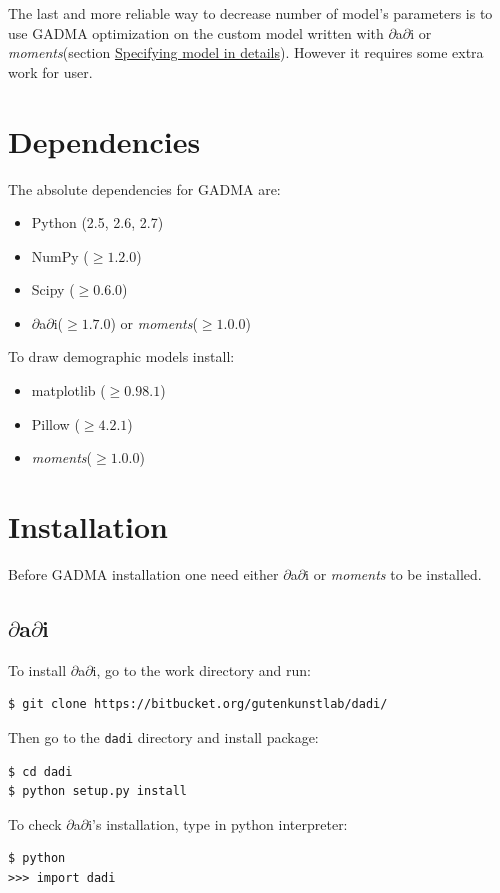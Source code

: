 \documentclass[12pt]{article}
\makeatletter
\newcommand{\dadi}{$\partial$a$\partial$i\xspace}
\newcommand{\moments}{\textit{moments}\xspace}
\newcommand{\py}[1]{\lstinline[language=Python, showstringspaces=False]@#1@}
\makeatother
\begin{document}
The last and more reliable way to decrease number of model's parameters is to use GADMA optimization on the custom model written with \dadi or \moments (section \hyperref[sec:spec-model-in-det]{Specifying model in details}). However it requires some extra work for user.

\newpage
\section{Dependencies}
The absolute dependencies for GADMA are:
\begin{itemize}
    \item Python (2.5, 2.6, 2.7)
    \item NumPy ($\geq 1.2.0$)
    \item Scipy ($\geq 0.6.0$)
    \item \dadi ($\geq 1.7.0$) or \moments ($\geq 1.0.0$)
\end{itemize}

To draw demographic models install:
\begin{itemize}
    \item matplotlib ($\geq 0.98.1$)
    \item Pillow ($\geq 4.2.1$)
    \item \moments ($\geq 1.0.0$)
\end{itemize}


\section{Installation}
Before GADMA installation one need either \dadi or \moments to be installed.

\subsection{\dadi}
To install \dadi, go to the work directory and run:

\begin{lstlisting}
$ git clone https://bitbucket.org/gutenkunstlab/dadi/
\end{lstlisting}

Then go to the \py{dadi} directory and install package:

\begin{lstlisting}
$ cd dadi
$ python setup.py install
\end{lstlisting}

To check \dadi's installation, type in python interpreter:

\begin{lstlisting}
$ python
>>> import dadi
\end{lstlisting}
\end{document}
